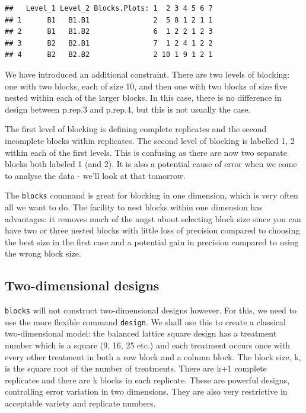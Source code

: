 \documentclass[
]{book}
\begin{document}
\begin{verbatim}
##   Level_1 Level_2 Blocks.Plots: 1  2 3 4 5 6 7
## 1      B1   B1.B1               2  5 8 1 2 1 1
## 2      B1   B1.B2               6  1 2 2 1 2 3
## 3      B2   B2.B1               7  1 2 4 1 2 2
## 4      B2   B2.B2               2 10 1 9 1 2 1
\end{verbatim}

We have introduced an additional constraint. There are two levels of blocking: one with two blocks, each of size 10, and then one with two blocks of size five nested within each of the larger blocks. In this case, there is no difference in design between p.rep.3 and p.rep.4, but this is not usually the case.

The first level of blocking is defining complete replicates and the second incomplete blocks within replicates. The second level of blocking is labelled 1, 2 within each of the first levels. This is confusing as there are now two separate blocks both labeled 1 (and 2). It is also a potential cause of error when we come to analyse the data - we'll look at that tomorrow.

The \texttt{blocks} command is great for blocking in one dimension, which is very often all we want to do. The facility to nest blocks within one dimension has advantages: it removes much of the angst about selecting block size since you can have two or three nested blocks with little loss of precision compared to choosing the best size in the first case and a potential gain in precision compared to using the wrong block size.

\hypertarget{two-dimensional-designs}{%
\subsection{Two-dimensional designs}\label{two-dimensional-designs}}

\texttt{blocks} will not construct two-dimensional designs however. For this, we need to use the more flexible command \texttt{design}. We shall use this to create a classical two-dimensional model: the balanced lattice square design has a treatment number which is a square (9, 16, 25 etc.) and each treatment occurs once with every other treatment in both a row block and a column block. The block size, k, is the square root of the number of treatments. There are k+1 complete replicates and there are k blocks in each replicate. These are powerful designs, controlling error variation in two dimensions. They are also very restrictive in acceptable variety and replicate numbers.
\end{document}
